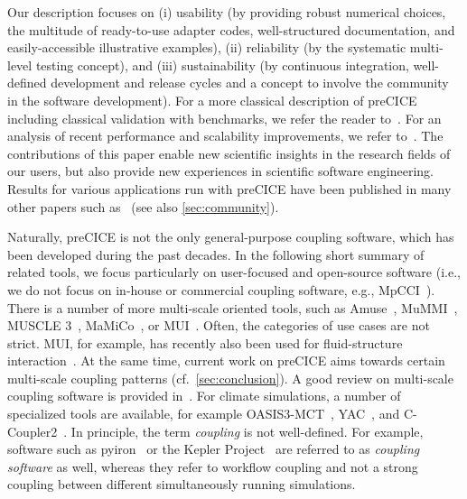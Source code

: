 Our description focuses on (i) usability (by providing robust numerical choices, the multitude of ready-to-use adapter codes, well-structured documentation, and easily-accessible illustrative examples), (ii) reliability (by the systematic multi-level testing concept), and (iii) sustainability (by continuous integration, well-defined development and release cycles and a concept to involve the community in the software development). For a more classical description of preCICE including classical validation with benchmarks, we refer the reader to~\cite{Bungartz2016_preCICE}. For an analysis of recent performance and scalability improvements, we refer to~\cite{Bungartz2016_ExaFSA_LNCSE, AminPerf2021}. The contributions of this paper enable new scientific insights in the research fields of our users, but also provide new experiences in scientific software engineering. Results for various applications run with preCICE have been published in many other papers such as~\cite{naseri2020scalable, Jaust2020, fan2020study, andrun2020simulating, Cocco2020} (see also \autoref{sec:community}).

Naturally, preCICE is not the only general-purpose coupling software, which has been developed during the past decades. In the following short summary of related tools, we focus particularly on user-focused and open-source software (i.e., we do not focus on in-house or commercial coupling software, e.g., MpCCI~\cite{Wolf2017}).  
There is a number of more multi-scale oriented tools, such as Amuse~\cite{Amuse}, MuMMI~\cite{MuMMI}, MUSCLE 3~\cite{veen2020easing}, MaMiCo~\cite{neumann2016mamico}, or MUI~\cite{tang2015multiscale}. Often, the categories of use cases are not strict. MUI, for example, has recently also been used for fluid-structure interaction~\cite{liu2021parallel}. At the same time, current work on preCICE aims towards certain multi-scale coupling patterns (cf.~\autoref{sec:conclusion}). A good review on multi-scale coupling software is provided in~\cite{groen2019mastering}.
For climate simulations, a number of specialized tools are available, for example OASIS3-MCT~\cite{Craig2017_OASIS3_MCT}, YAC~\cite{Hanke2016_YAC}, and C-Coupler2~\cite{Liu2018_C-Coupler2}.
In principle, the term \textit{coupling} is not well-defined. For example, software such as pyiron~\cite{Janssen2019_Pyiron} or the Kepler Project~\cite{Ludascher2006_Kepler} are referred to as \textit{coupling software} as well, whereas they refer to workflow coupling and not a strong coupling between different simultaneously running simulations.

